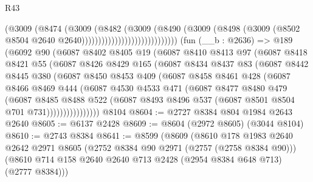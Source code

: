 \begin{lexlean}{R43}
\begin{coremodule}
                                          (@3009
                                            (@8474
                                              (@3009
                                                (@8482
                                                  (@3009
                                                    (@8490
                                                      (@3009
                                                        (@8498
                                                          (@3009
                                                            (@8502
                                                              @8504
                                                              @2640
                                                              @2640)))))))))))))))))))))))))))))
    (fun (__b : @2636) =>
    @189
      (@6092
        @90
        (@6087
          @8402
          @8405
          @19
          (@6087
            @8410
            @8413
            @97
            (@6087
              @8418
              @8421
              @55
              (@6087
                @8426
                @8429
                @165
                (@6087
                  @8434
                  @8437
                  @83
                  (@6087
                    @8442
                    @8445
                    @380
                    (@6087
                      @8450
                      @8453
                      @409
                      (@6087
                        @8458
                        @8461
                        @428
                        (@6087
                          @8466
                          @8469
                          @444
                          (@6087
                            @4530
                            @4533
                            @471
                            (@6087
                              @8477
                              @8480
                              @479
                              (@6087
                                @8485
                                @8488
                                @522
                                (@6087 @8493 @8496 @537 (@6087 @8501 @8504 @701 @731))))))))))))))))
    @8104
@8604 := @2727 @8384 @804 @1984 @2643 @2640
@8605 := @6137 @2428
@8609 := @8604 (@2972 @8605) (@3044 @8104)
@8610 := @2743 @8384
@8641 := @8599
    (@8609
      (@8610
        @178
        @1983
        @2640
        @2642
        @2971
        @8605
        (@2752 @8384 @90 @2971 (@2757 (@2758 @8384 @90)))
        (@8610 @714 @158 @2640 @2640 @713 @2428 (@2954 @8384 @648 @713) (@2777 @8384)))

\end{coremodule}
\end{lexlean}
